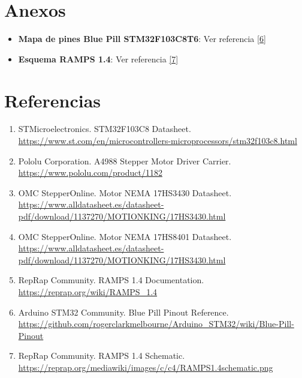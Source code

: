 \section{Anexos}

\begin{itemize}
  \item \textbf{Mapa de pines Blue Pill STM32F103C8T6}: Ver referencia \hyperref[ref6]{[6]}
  \item \textbf{Esquema RAMPS 1.4}: Ver referencia \hyperref[ref7]{[7]}
\end{itemize}

\section{Referencias}

\begin{enumerate}
  \item \label{ref1} STMicroelectronics. STM32F103C8 Datasheet. \\
  \url{https://www.st.com/en/microcontrollers-microprocessors/stm32f103c8.html}
  
  \item \label{ref2} Pololu Corporation. A4988 Stepper Motor Driver Carrier. \\
  \url{https://www.pololu.com/product/1182}
  
  \item \label{ref3} OMC StepperOnline. Motor NEMA 17HS3430 Datasheet. \\
  \url{https://www.alldatasheet.es/datasheet-pdf/download/1137270/MOTIONKING/17HS3430.html}
  
  \item \label{ref4} OMC StepperOnline. Motor NEMA 17HS8401 Datasheet. \\
  \url{https://www.alldatasheet.es/datasheet-pdf/download/1137270/MOTIONKING/17HS3430.html}
  
  \item \label{ref5} RepRap Community. RAMPS 1.4 Documentation. \\
  \url{https://reprap.org/wiki/RAMPS_1.4}
  
  \item \label{ref6} Arduino STM32 Community. Blue Pill Pinout Reference. \\
  \url{https://github.com/rogerclarkmelbourne/Arduino_STM32/wiki/Blue-Pill-Pinout}
  
  \item \label{ref7} RepRap Community. RAMPS 1.4 Schematic. \\
  \url{https://reprap.org/mediawiki/images/c/c4/RAMPS1.4schematic.png}
\end{enumerate}



